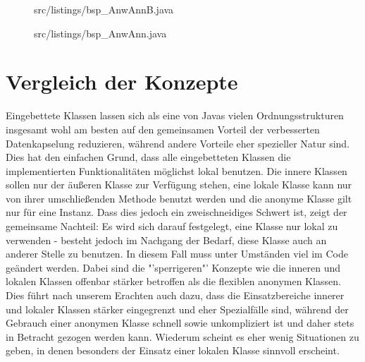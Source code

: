 \begin{figure}[H]
\lstset{language=Java}
 {src/listings/bsp_AnwAnnB.java}
\end{figure}
\newpage

\begin{figure}[H]
\lstset{language=Java}
 {src/listings/bsp_AnwAnn.java}
\end{figure}
\newpage

\section{Vergleich der Konzepte}

Eingebettete Klassen lassen sich als eine von Javas vielen Ordnungsstrukturen insgesamt wohl am besten auf den gemeinsamen Vorteil der verbesserten Datenkapselung reduzieren, während andere Vorteile eher spezieller Natur sind.
Dies hat den einfachen Grund, dass alle eingebetteten Klassen die implementierten Funktionalitäten möglichst lokal benutzen. Die innere Klassen sollen nur der äußeren Klasse zur Verfügung stehen,
eine lokale Klasse kann nur von ihrer umschließenden Methode benutzt werden und die anonyme Klasse gilt nur für eine Instanz. Dass dies jedoch ein zweischneidiges Schwert ist, zeigt der gemeinsame Nachteil:
Es wird sich darauf festgelegt, eine Klasse nur lokal zu verwenden - besteht jedoch im Nachgang der Bedarf, diese Klasse auch an anderer Stelle zu benutzen. In diesem Fall muss unter Umständen viel im Code geändert werden.
Dabei sind die "'sperrigeren"' Konzepte wie die inneren und lokalen Klassen offenbar stärker betroffen als die flexiblen anonymen Klassen.
Dies führt nach unserem Erachten auch dazu, dass die Einsatzbereiche innerer und lokaler Klassen stärker eingegrenzt und eher Spezialfälle sind, während der Gebrauch einer anonymen Klasse
schnell sowie unkompliziert ist und daher stets in Betracht gezogen werden kann. Wiederum scheint es eher wenig Situationen zu geben, in denen besonders der Einsatz einer lokalen Klasse sinnvoll erscheint.
